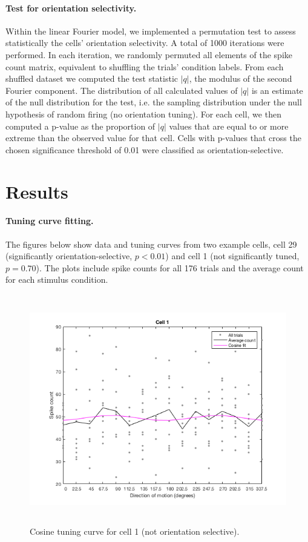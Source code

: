 \documentclass[10pt]{article}
\begin{document}
\paragraph{Test for orientation selectivity.} Within the linear Fourier model, we implemented a permutation test to assess statistically the cells' orientation selectivity. A total of 1000 iterations were performed. In each iteration, we randomly permuted all elements of the spike count matrix, equivalent to shuffling the trials' condition labels. From each shuffled dataset we computed the test statistic $|q|$, the modulus of the second Fourier component. The distribution of all calculated values of $|q|$ is an estimate of the null distribution for the test, i.e. the sampling distribution under the null hypothesis of random firing (no orientation tuning). For each cell, we then computed a p-value as the proportion of $|q|$ values that are equal to or more extreme than the observed value for that cell. Cells with p-values that cross the chosen significance threshold of 0.01 were classified as orientation-selective.

\section*{Results}
 
\paragraph{Tuning curve fitting.} The figures below show data and tuning curves from two example cells, cell 29 (significantly orientation-selective, $p<0.01$) and cell 1 (not significantly tuned, $p=0.70$). The plots include spike counts for all 176 trials and the average count for each stimulus condition.

\newpage

\begin{figure}[!h]
\centering
\includegraphics[height=10cm]{fitCosCell1.png}
\caption{Cosine tuning curve for cell 1 (not orientation selective).
\label{fitCos1}}
\end{figure}
\end{document}
